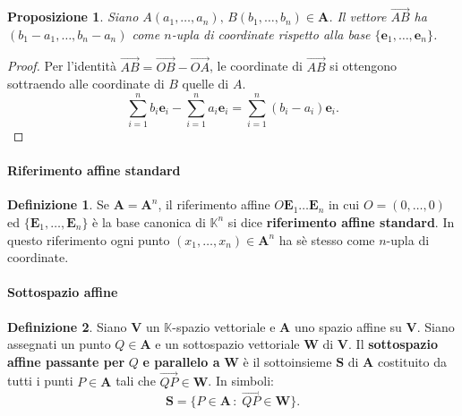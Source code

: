 \documentclass{article}
\theoremstyle{plain}
\newtheorem{prop}[thm]{Proposizione}
\theoremstyle{definition}
\newtheorem{defn}{Definizione}[section]
\theoremstyle{remark}
\begin{document}
\vspace{10pt}

\begin{bxthm}
\begin{prop}
    Siano $A(a_1,\dots,a_n),\,B(b_1,\dots,b_n)\in\mathbf{A}$. 
    Il vettore $\overrightarrow{AB}$ ha $(b_1-a_1,\dots,b_n-a_n)$ come $n$-upla di coordinate rispetto alla base $\{\mathbf{e}_1,\dots,\mathbf{e}_n\}$.
\end{prop}
\end{bxthm}
\begin{proof}
    Per l'identità $\overrightarrow{AB}=\overrightarrow{OB}-\overrightarrow{OA}$, le coordinate di $\overrightarrow{AB}$ si ottengono sottraendo alle coordinate di $B$ quelle di $A$.
    \[\sum_{i=1}^{n}b_i\mathbf{e}_i-\sum_{i=1}^{n}a_i\mathbf{e}_i=\sum_{i=1}^{n}(b_i-a_i)\mathbf{e}_i.\]
\end{proof}

\vspace{10pt}

\paragraph{Riferimento affine standard}
\begin{bxthm}
\begin{defn}
    Se $\mathbf{A}=\mathbf{A}^n$, il riferimento affine $O\mathbf{E}_1\dots\mathbf{E}_n$ in cui $O=(0,\dots,0)$ ed $\{\mathbf{E}_1,\dots,\mathbf{E}_n\}$ è la base canonica di $\mathbb{K}^n$ si dice \textbf{riferimento affine standard}. In questo riferimento ogni punto $(x_1,\dots,x_n)\in\mathbf{A}^n$ ha sè stesso come $n$-upla di coordinate.
\end{defn}
\end{bxthm}

\vspace{10pt}

\paragraph{Sottospazio affine}
\begin{bxthm}
\begin{defn}
    Siano $\mathbf{V}$ un $\mathbb{K}$-spazio vettoriale e $\mathbf{A}$ uno spazio affine su $\mathbf{V}$. 
    Siano assegnati un punto $Q\in\mathbf{A}$ e un sottospazio vettoriale $\mathbf{W}$ di $\mathbf{V}$. 
    Il \textbf{sottospazio affine passante per} $Q$ \textbf{e parallelo a} $\mathbf{W}$ è il sottoinsieme $\mathbf{S}$ di $\mathbf{A}$ costituito da 
    tutti i punti $P\in \mathbf{A}$ tali che $\overrightarrow{QP}\in\mathbf{W}$.
    In simboli: \[\mathbf{S}=\{P\in \mathbf{A}\,:\;\overrightarrow{QP}\in\mathbf{W}\}.\]
\end{defn}
\end{bxthm}
\end{document}
